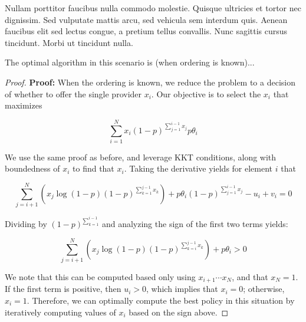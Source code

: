  Nullam porttitor faucibus nulla commodo molestie. Quisque ultricies et tortor nec dignissim. Sed vulputate mattis arcu, sed vehicula sem interdum quis. Aenean faucibus elit sed lectus congue, a pretium tellus convallis. Nunc sagittis cursus tincidunt. Morbi ut tincidunt nulla.
\begin{lemma}
    The optimal algorithm in this scenario is (when ordering is known)...
\end{lemma}
\begin{proof}
    \textbf{Proof:} When the ordering is known, we reduce the problem to a decision of whether to offer the single provider $x_{i}$. 
    Our objective is to select the $x_{i}$ that maximizes 

    \begin{equation}
        \sum_{i=1}^{N} x_{i} (1-p)^{\sum_{j=1}^{i-1} x_{j}} p \theta_{i}
    \end{equation}

    We use the same proof as before, and leverage KKT conditions, along with boundedness of $x_{i}$ to find that $x_{i}$. 
    Taking the derivative yields for element $i$ that 

    \begin{equation}
        \sum_{j=i+1}^{N} (x_{j} \log(1-p) (1-p)^{\sum_{k=1}^{j-1} x_{k}}) + p \theta_{i} (1-p)^{\sum_{j=1}^{i-1} x_{j}}  - u_{i} + v_{i} = 0 
    \end{equation}

    Dividing by $(1-p)^{\sum_{k=1}^{i-1}}$ and analyzing the sign of the first two terms yields: 

    \begin{equation}
        \sum_{j=i+1}^{N} (x_{j} \log(1-p) (1-p)^{\sum_{k=i}^{j-1} x_{k}}) + p \theta_{i} > 0
    \end{equation}

    We note that this can be computed based only using $x_{i+1} \cdots x_{N}$, and that $x_{N}=1$. 
    If the first term is positive, then $u_{i}>0$, which implies that $x_{i} = 0$; otherwise, $x_{i} = 1$. 
    Therefore, we can optimally compute the best policy in this situation by iteratively computing values of $x_{i}$ based on the sign above. 

\end{proof}


